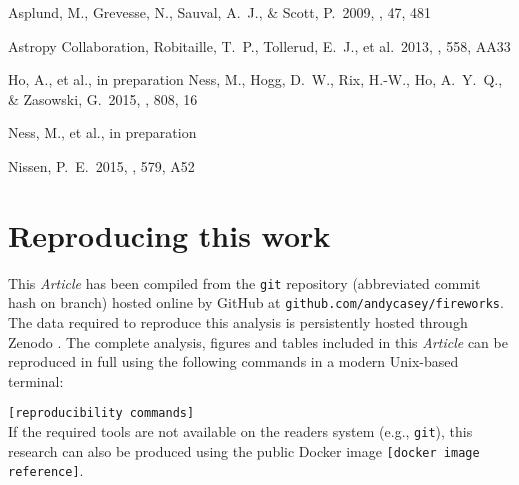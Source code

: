 \documentclass[useAMS,usenatbib]{mn2e}
\newcommand\article{\textit{Article}}
\begin{document}
\begin{thebibliography}{99}

 Asplund, M., Grevesse, N., Sauval, A.~J., \& Scott, P.\ 2009, \araa, 47, 481 

 Astropy Collaboration, Robitaille, T.~P., Tollerud, E.~J., et al.\ 2013, \aap, 558, AA33

 Ho, A., et al., in preparation
 Ness, M., Hogg, D.~W., Rix, H.-W., Ho, A.~Y.~Q., \& Zasowski, G.\ 2015, \apj, 808, 16 

 Ness, M., et al., in preparation

 Nissen, P.~E.\ 2015, \aap, 579, A52 


\end{thebibliography}


\label{lastpage}

\appendix
\section{Reproducing this work}
\label{appendix:reproducibility}

This \article{} has been compiled from the \texttt{git} repository (abbreviated commit hash \texttt{\gitAbbrevHash} on \texttt{\gitBranch} branch) hosted online by GitHub at \texttt{github.com/andycasey/fireworks}. The data required to reproduce this analysis is persistently hosted through Zenodo \citep{DATA}. The complete analysis, figures and tables included in this \article{} can be reproduced in full using the following commands in a modern Unix-based terminal:
\vspace{0.5em}

\noindent\texttt{[reproducibility commands]} 
\vspace{0.5em} \\
If the required tools are not available on the readers system (e.g., \texttt{git}), this research can also be produced using the public Docker image \texttt{[docker image reference]}.
\end{document}
